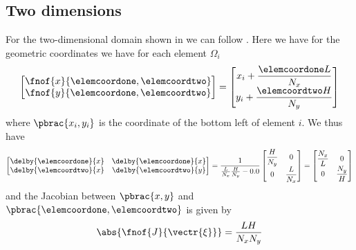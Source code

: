 \subsection{Two dimensions}
\label{subsec:ElementStiffnessMatrixLaplace2D}

For the two-dimensional domain shown in
 we can follow
. Here we have for the geometric
coordinates we have for each element $\Omega_{i}$
\begin{equation}
  \begin{bmatrix}
    \fnof{x}{\elemcoordone,\elemcoordtwo} \\
    \fnof{y}{\elemcoordone,\elemcoordtwo}
  \end{bmatrix}= \begin{bmatrix}
    x_{i}+\dfrac{\elemcoordone L}{N_{x}} \\
    y_{i}+\dfrac{\elemcoordtwo H}{N_{y}}  
  \end{bmatrix}
\end{equation}
where $\pbrac{x_{i},y_{i}}$ is the coordinate of the bottom left of element $i$. We thus have 
\begin{equation}
  \begin{bmatrix}
    \delby{\elemcoordone}{x} & \delby{\elemcoordone}{x} \\
    \delby{\elemcoordtwo}{x} & \delby{\elemcoordtwo}{y}         
  \end{bmatrix} = \dfrac{1}{\frac{L}{N_{x}}\frac{H}{N_{y}}-0.0} \begin{bmatrix}
    \dfrac{H}{N_{y}} & 0 \\
    0 & \dfrac{L}{N_{x}}
  \end{bmatrix} = \begin{bmatrix}
    \dfrac{N_{x}}{L} & 0 \\
    0 & \dfrac{N_{y}}{H}
  \end{bmatrix}
\end{equation}
and the Jacobian between $\pbrac{x,y}$ and $\pbrac{\elemcoordone,\elemcoordtwo}$ is given by
\begin{equation}
  \abs{\fnof{J}{\vectr{\xi}}}=\dfrac{LH}{N_{x}N_{y}}
\end{equation}

